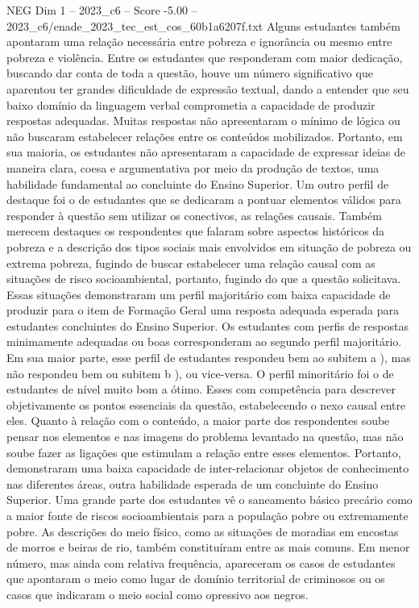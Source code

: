 \begin{textsample}{NEG Dim 1 – 2023\_c6 – Score -5.00 – 2023\_c6/enade\_2023\_tec\_est\_cos\_60b1a6207f.txt}
Alguns estudantes também apontaram uma relação necessária entre pobreza e ignorância ou mesmo entre pobreza e violência.
Entre os estudantes que responderam com maior dedicação, buscando dar conta de toda a questão, houve um número significativo que aparentou ter grandes dificuldade de expressão textual, dando a entender que seu baixo domínio da linguagem verbal comprometia a capacidade de produzir respostas adequadas.
Muitas respostas não apresentaram o mínimo de lógica ou não buscaram estabelecer relações entre os conteúdos mobilizados.
Portanto, em sua maioria, os estudantes não apresentaram a capacidade de expressar ideias de maneira clara, coesa e argumentativa por meio da produção de textos, uma habilidade fundamental ao concluinte do Ensino Superior.
Um outro perfil de destaque foi o de estudantes que se dedicaram a pontuar elementos válidos para responder à questão sem utilizar os conectivos, as relações causais.
Também merecem destaques os respondentes que falaram sobre aspectos históricos da pobreza e a descrição dos tipos sociais mais envolvidos em situação de pobreza ou extrema pobreza, fugindo de buscar estabelecer uma relação causal com as situações de risco socioambiental, portanto, fugindo do que a questão solicitava.
Essas situações demonstraram um perfil majoritário com baixa capacidade de produzir para o item de Formação Geral uma resposta adequada esperada para estudantes concluintes do Ensino Superior.
Os estudantes com perfis de respostas minimamente adequadas ou boas corresponderam ao segundo perfil majoritário.
Em sua maior parte, esse perfil de estudantes respondeu bem ao subitem a ), mas não respondeu bem ou subitem b ), ou vice-versa.
O perfil minoritário foi o de estudantes de nível muito bom a ótimo.
Esses com competência para descrever objetivamente os pontos essenciais da questão, estabelecendo o nexo causal entre eles.
Quanto à relação com o conteúdo, a maior parte dos respondentes soube pensar nos elementos e nas imagens do problema levantado na questão, mas não soube fazer as ligações que estimulam a relação entre esses elementos.
Portanto, demonstraram uma baixa capacidade de inter-relacionar objetos de conhecimento nas diferentes áreas, outra habilidade esperada de um concluinte do Ensino Superior.
Uma grande parte dos estudantes vê o saneamento básico precário como a maior fonte de riscos socioambientais para a população pobre ou extremamente pobre.
As descrições do meio físico, como as situações de moradias em encostas de morros e beiras de rio, também constituíram entre as mais comuns.
Em menor número, mas ainda com relativa frequência, apareceram os casos de estudantes que apontaram o meio como lugar de domínio territorial de criminosos ou os casos que indicaram o meio social como opressivo aos negros.

\end{textsample}
